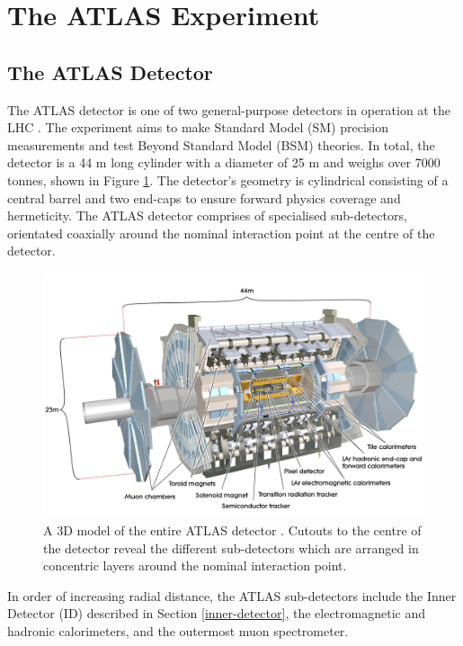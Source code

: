 \section{The ATLAS Experiment}
\label{atlas-section}

\subsection{The ATLAS Detector}
The ATLAS detector is one of two general-purpose detectors in operation at the \ac{LHC} \cite{PERF-2007-01}. The experiment aims to make Standard Model (SM) precision measurements and test Beyond Standard Model (BSM) theories. In total, the detector is a 44 m long cylinder with a diameter of 25 m and weighs over 7000 tonnes, shown in Figure \ref{fig: atlas-detector}. The detector’s geometry is cylindrical consisting of a central barrel and two end-caps to ensure forward physics coverage and hermeticity. The ATLAS detector comprises of specialised sub-detectors, orientated coaxially around the nominal interaction point at the centre of the detector. 

\begin{figure}[htb!]
\includegraphics[width=\textwidth]{images/2-LHC-ATLAS/atlas_detector.jpg}
\caption{A 3D model of the entire ATLAS detector \cite{Jon-And:1237407}. Cutouts to the centre of the detector reveal the different sub-detectors which are arranged in concentric layers around the nominal interaction point.}
\label{fig: atlas-detector}
\end{figure}

In order of increasing radial distance, the ATLAS sub-detectors include the Inner Detector (ID) described in Section \ref{inner-detector}, the electromagnetic and hadronic calorimeters, and the outermost muon spectrometer. 

